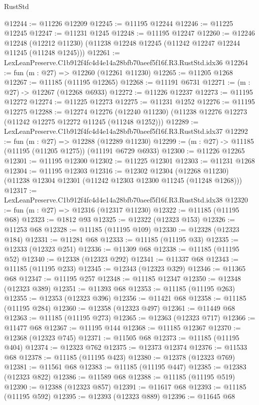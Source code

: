 \begin{lexlean}{RustStd}
\begin{coremodule}
@12244 := @11226 @12209
@12245 := @11195 @12244
@12246 := @11225 @12245
@12247 := @11231 @1245
@12248 := @11195 @12247
@12260 := @12246
    @12248
    (@12212 @11230)
    (@11238 @12248 @12245 (@11242 @12247 @12244 @11245 (@11248 @1245)))
@12261 := LexLeanPreserve.C1b912f4fc4d4e14a28bfb70aeef5f16f.R3.RustStd.idx36
@12264 := fun (m : @27) => @12260 (@12261 @11230)
@12265 := @11205 @1268
@12267 := @11185 (@11195 @12265)
@12268 := @11191 @6731
@12271 := (m : @27) -> @12267 (@12268 @6933)
@12272 := @11226 @12237
@12273 := @11195 @12272
@12274 := @11225 @12273
@12275 := @11231 @1252
@12276 := @11195 @12275
@12288 := @12274
    @12276
    (@12240 @11230)
    (@11238 @12276 @12273 (@11242 @12275 @12272 @11245 (@11248 @1252)))
@12289 := LexLeanPreserve.C1b912f4fc4d4e14a28bfb70aeef5f16f.R3.RustStd.idx37
@12292 := fun (m : @27) => @12288 (@12289 @11230)
@12299 := (m : @27) -> @11185 (@11195 (@11205 @1275)) (@11191 @6729 @6933)
@12300 := @11226 @12265
@12301 := @11195 @12300
@12302 := @11225 @12301
@12303 := @11231 @1268
@12304 := @11195 @12303
@12316 := @12302
    @12304
    (@12268 @11230)
    (@11238 @12304 @12301 (@11242 @12303 @12300 @11245 (@11248 @1268)))
@12317 := LexLeanPreserve.C1b912f4fc4d4e14a28bfb70aeef5f16f.R3.RustStd.idx38
@12320 := fun (m : @27) => @12316 (@12317 @11230)
@12322 := @11185 (@11195 @68)
@12323 := @1812 @93
@12325 := @12322 (@12323 @153)
@12326 := @11253 @68
@12328 := @11185 (@11195 @109)
@12330 := @12328 (@12323 @184)
@12331 := @11281 @68
@12333 := @11185 (@11195 @33)
@12335 := @12333 (@12323 @251)
@12336 := @11309 @68
@12338 := @11185 (@11195 @52)
@12340 := @12338 (@12323 @292)
@12341 := @11337 @68
@12343 := @11185 (@11195 @233)
@12345 := @12343 (@12323 @329)
@12346 := @11365 @68
@12347 := @11195 @257
@12348 := @11185 @12347
@12350 := @12348 (@12323 @389)
@12351 := @11393 @68
@12353 := @11185 (@11195 @263)
@12355 := @12353 (@12323 @396)
@12356 := @11421 @68
@12358 := @11185 (@11195 @284)
@12360 := @12358 (@12323 @497)
@12361 := @11449 @68
@12363 := @11185 (@11195 @273)
@12365 := @12363 (@12323 @717)
@12366 := @11477 @68
@12367 := @11195 @144
@12368 := @11185 @12367
@12370 := @12368 (@12323 @745)
@12371 := @11505 @68
@12373 := @11185 (@11195 @404)
@12374 := @12323 @762
@12375 := @12373 @12374
@12376 := @11533 @68
@12378 := @11185 (@11195 @423)
@12380 := @12378 (@12323 @769)
@12381 := @11561 @68
@12383 := @11185 (@11195 @447)
@12385 := @12383 (@12323 @822)
@12386 := @11589 @68
@12388 := @11185 (@11195 @519)
@12390 := @12388 (@12323 @857)
@12391 := @11617 @68
@12393 := @11185 (@11195 @592)
@12395 := @12393 (@12323 @889)
@12396 := @11645 @68

\end{coremodule}
\end{lexlean}
